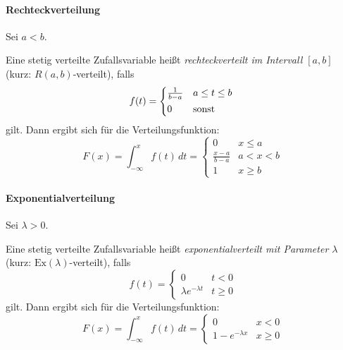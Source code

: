 				\paragraph{Rechteckverteilung}
					Sei \( a < b \).

					Eine stetig verteilte Zufallsvariable heißt \textit{rechteckverteilt im Intervall \( [a, b] \)} (kurz: \( R(a, b) \)-verteilt), falls
					\begin{equation*}
						f(t) =
						\begin{cases*}
							\frac{1}{b - a} & \(a \leq t \leq b\) \\
							0               & \textrm{sonst}
						\end{cases*}
					\end{equation*}
					gilt. Dann ergibt sich für die Verteilungsfunktion:
					\begin{equation*}
						F(x) = \int_{-\infty}^{x} \! f(t) \, dt =
						\begin{cases}
							0                   & x \leq a  \\
							\frac{x - a}{b - a} & a < x < b \\
							1                   & x \geq b
						\end{cases}
					\end{equation*}

				\paragraph{Exponentialverteilung}
					Sei \( \lambda > 0 \).

					Eine stetig verteilte Zufallsvariable heißt \textit{exponentialverteilt mit Parameter \(\lambda\)} (kurz: \( \mathrm{Ex}(\lambda) \)-verteilt), falls
					\begin{equation*}
						f(t) =
						\begin{cases}
							0                          & t < 0    \\
							\lambda e ^ { -\lambda t } & t \geq 0
						\end{cases}
					\end{equation*}
					gilt. Dann ergibt sich für die Verteilungsfunktion:
					\begin{equation*}
						F(x) = \int_{-\infty}^{x} \! f(t) \, dt =
						\begin{cases}
							0                  & x < 0    \\
							1 - e^{-\lambda x} & x \geq 0
						\end{cases}
					\end{equation*}

